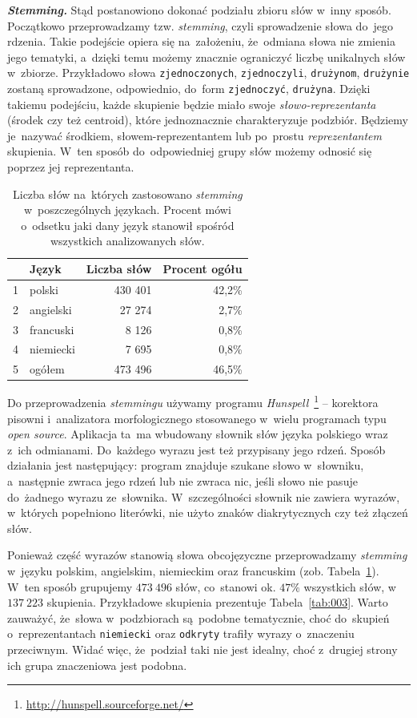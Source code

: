 \documentclass{praca1}
\begin{document}
\emph{\textbf{Stemming.}}
Stąd postanowiono dokonać podziału zbioru słów w~inny sposób. Początkowo przeprowadzamy tzw. \emph{stemming}, czyli sprowadzenie słowa do~jego rdzenia. Takie podejście opiera się na~założeniu, że~odmiana słowa nie zmienia jego tematyki, a~dzięki temu możemy znacznie ograniczyć liczbę unikalnych słów w~zbiorze. Przykładowo słowa \verb|zjednoczonych|, \verb|zjednoczyli|, \verb|drużynom|, \verb|drużynie| zostaną sprowadzone, odpowiednio, do~form \verb|zjednoczyć|, \verb|drużyna|. Dzięki takiemu podejściu, każde skupienie będzie miało swoje \emph{słowo-reprezentanta} (środek czy też centroid), które jednoznacznie charakteryzuje podzbiór. Będziemy je~nazywać środkiem, słowem-reprezentantem lub po~prostu \emph{reprezentantem} skupienia. W~ten sposób do~odpowiedniej grupy słów możemy odnosić się poprzez jej reprezentanta.

\begin{table}[!h]
\centering
\caption{Liczba słów na~których zastosowano \emph{stemming} w~poszczególnych językach. Procent mówi o~odsetku jaki dany język stanowił spośród wszystkich analizowanych słów.}
\begin{tabular}{|rl|rr|}
  \hline
 & Język & Liczba słów & Procent ogółu\\ 
  \hline
1 & polski & 430 401 & 42,2\% \\ 
  2 & angielski & 27 274 & 2,7\% \\ 
  3 & francuski & 8 126 & 0,8\% \\ 
  4 & niemiecki & 7 695 & 0,8\% \\ \hline
  5 & ogółem & 473 496 & 46,5\% \\ 
   \hline
\end{tabular}
\label{tab:002}
\end{table}

Do przeprowadzenia \emph{stemmingu} używamy programu \emph{Hunspell}~\footnote{\url{http://hunspell.sourceforge.net/}} -- korektora pisowni i~analizatora morfologicznego stosowanego w~wielu programach typu \emph{open source}. Aplikacja ta~ma wbudowany słownik słów języka polskiego wraz z~ich odmianami. Do~każdego wyrazu jest też przypisany jego rdzeń. Sposób działania jest następujący: program znajduje szukane słowo w~słowniku, a~następnie zwraca jego rdzeń lub nie zwraca nic, jeśli słowo nie pasuje do~żadnego wyrazu ze~słownika. W~szczególności słownik nie zawiera wyrazów, w~których popełniono literówki, nie użyto znaków diakrytycznych czy też złączeń słów.

Ponieważ część wyrazów stanowią słowa obcojęzyczne przeprowadzamy \emph{stemming} w~języku polskim, angielskim, niemieckim oraz francuskim (zob. Tabela~\ref{tab:002}). W~ten sposób grupujemy $473\ 496$ słów, co~stanowi ok. $47\%$ wszystkich słów, w~$137\ 223$ skupienia. Przykładowe skupienia prezentuje Tabela~\ref{tab:003}. Warto zauważyć, że~słowa w~podzbiorach są~podobne tematycznie, choć do~skupień o~reprezentantach \verb|niemiecki| oraz \verb|odkryty| trafiły wyrazy o~znaczeniu przeciwnym. Widać więc, że~podział taki nie jest idealny, choć z~drugiej strony ich grupa znaczeniowa jest podobna.
\end{document}
